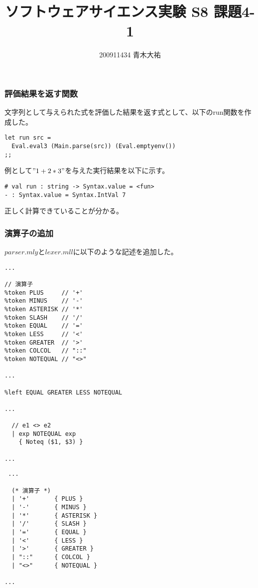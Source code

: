 \documentclass[a4paper,9pt]{jarticle}
\title{ソフトウェアサイエンス実験 S8 課題4-1}
\author{200911434 青木大祐}
\begin{document}
\maketitle
\setcounter{section}{4}
\setcounter{subsection}{1}

\newpage
\subsubsection{評価結果を返す関数}
文字列として与えられた式を評価した結果を返す式として、以下のrun関数を作
成した。
\begin{lstlisting}
let run src =
  Eval.eval3 (Main.parse(src)) (Eval.emptyenv())
;;
\end{lstlisting}
例として$"1+2*3"$を与えた実行結果を以下に示す。

\begin{lstlisting}
# val run : string -> Syntax.value = <fun>
- : Syntax.value = Syntax.IntVal 7
\end{lstlisting}
正しく計算できていることが分かる。

\subsubsection{演算子の追加}
$parser.mly$と$lexer.mll$に以下のような記述を追加した。
\begin{lstlisting}
...

// 演算子
%token PLUS     // '+'
%token MINUS    // '-'
%token ASTERISK // '*'
%token SLASH    // '/'
%token EQUAL    // '='
%token LESS     // '<'
%token GREATER  // '>'
%token COLCOL   // "::"
%token NOTEQUAL // "<>"

...

%left EQUAL GREATER LESS NOTEQUAL

...

  // e1 <> e2
  | exp NOTEQUAL exp
    { Noteq ($1, $3) }
    
...
\end{lstlisting}

\begin{lstlisting}
 ...

  (* 演算子 *)
  | '+'       { PLUS }
  | '-'       { MINUS }
  | '*'       { ASTERISK }
  | '/'       { SLASH }
  | '='       { EQUAL }
  | '<'       { LESS }
  | '>'       { GREATER }
  | "::"      { COLCOL }
  | "<>"      { NOTEQUAL }

...
\end{lstlisting}
\end{document}
